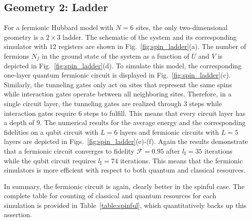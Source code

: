 \documentclass[aps, pra, reprint, superscriptaddress]{revtex4-1}
\begin{document}
\subsection{Geometry 2: Ladder}
\label{subsec:spin_ladder}
For a fermionic Hubbard model with $N{=}6$ sites, the only two-dimensional geometry is a $2{\times} 3$ ladder. The schematic of the system and its corresponding simulator with $12$ registers are shown in Fig.~\ref{fig:spin_ladder}(a). The number of fermions $N_f$ in the ground state of the system as a function of $U$ and $V$ is  depicted in Fig.~\ref{fig:spin_ladder}(d).
To simulate this model, the corresponding one-layer quantum fermionic circuit is displayed in Fig.~\ref{fig:spin_ladder}(c). Similarly, the tunneling gates only act on sites that represent the same spins while interaction gates operate between all neighboring sites. Therefore, in a single circuit layer, the tunneling gates are realized through $3$ steps while interaction gates require $6$ steps to fulfill. This means that every circuit layer has a depth of $9$.  
The numerical results for the average energy and the corresponding fidelities on a qubit circuit with $L{=}6$ layers and fermionic circuits with $L{=}5$ layers are depicted in Figs.~\ref{fig:spin_ladder}(e)-(f). Again the results demonstrate that a fermionic circuit converges to fidelity $\mathcal{F}{=}0.95$ after $l_\text{I}{=}35$ iterations while the qubit circuit requires $l_\text{I}{=}74$ iterations.   This means that the fermionic simulators is more efficient with respect to both quantum and classical resources. 

\noindent In summary, the fermionic circuit is again, clearly better in the spinful case. The complete table for counting of classical and quantum resources for each simulation is provided in Table~\ref{table:spinful}, which quantitatively backs up this assertion.
\end{document}
